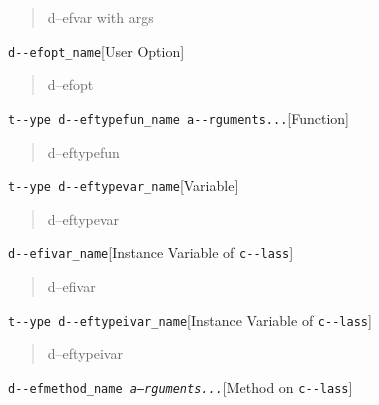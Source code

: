 \documentclass{book}
\begin{document}
\begin{titlepage}
%
\begin{quote}
\unskip{\parskip=0pt\noindent}%
d--efvar with args
\end{quote}

\noindent\texttt{d{-}{-}efopt\_name}\hfill[User Option]



%
\begin{quote}
\unskip{\parskip=0pt\noindent}%
d--efopt
\end{quote}

\noindent\texttt{t{-}{-}ype d{-}{-}eftypefun\_name a{-}{-}rguments...}\hfill[Function]



%
\begin{quote}
\unskip{\parskip=0pt\noindent}%
d--eftypefun
\end{quote}

\noindent\texttt{t{-}{-}ype d{-}{-}eftypevar\_name}\hfill[Variable]



%
\begin{quote}
\unskip{\parskip=0pt\noindent}%
d--eftypevar
\end{quote}

\noindent\texttt{d{-}{-}efivar\_name}\hfill[Instance Variable of \texttt{c{-}{-}lass}]



%
\begin{quote}
\unskip{\parskip=0pt\noindent}%
d--efivar
\end{quote}

\noindent\texttt{t{-}{-}ype d{-}{-}eftypeivar\_name}\hfill[Instance Variable of \texttt{c{-}{-}lass}]



%
\begin{quote}
\unskip{\parskip=0pt\noindent}%
d--eftypeivar
\end{quote}

\noindent\texttt{d{-}{-}efmethod\_name \EmbracOn{}\textnormal{\textsl{a--rguments...}}\EmbracOff{}}\hfill[Method on \texttt{c{-}{-}lass}]




\end{titlepage}
\end{document}
